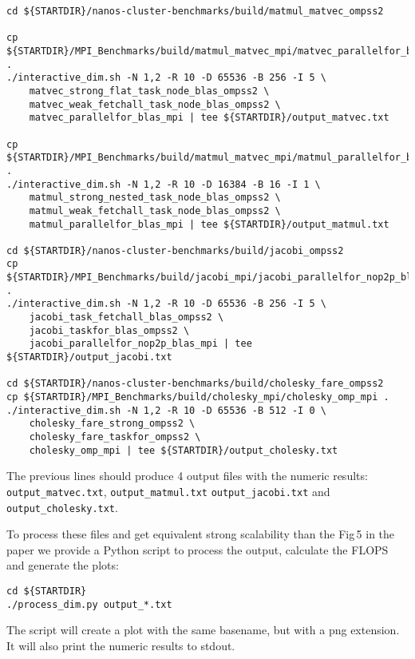 \documentclass{article}
\newcommand{\code}[1]{\texttt{#1}}
\begin{document}
\begin{lstlisting}
cd ${STARTDIR}/nanos-cluster-benchmarks/build/matmul_matvec_ompss2

cp ${STARTDIR}/MPI_Benchmarks/build/matmul_matvec_mpi/matvec_parallelfor_blas_mpi .
./interactive_dim.sh -N 1,2 -R 10 -D 65536 -B 256 -I 5 \
	matvec_strong_flat_task_node_blas_ompss2 \
	matvec_weak_fetchall_task_node_blas_ompss2 \
	matvec_parallelfor_blas_mpi | tee ${STARTDIR}/output_matvec.txt

cp ${STARTDIR}/MPI_Benchmarks/build/matmul_matvec_mpi/matmul_parallelfor_blas_mpi .
./interactive_dim.sh -N 1,2 -R 10 -D 16384 -B 16 -I 1 \
	matmul_strong_nested_task_node_blas_ompss2 \
	matmul_weak_fetchall_task_node_blas_ompss2 \
	matmul_parallelfor_blas_mpi | tee ${STARTDIR}/output_matmul.txt

cd ${STARTDIR}/nanos-cluster-benchmarks/build/jacobi_ompss2
cp ${STARTDIR}/MPI_Benchmarks/build/jacobi_mpi/jacobi_parallelfor_nop2p_blas_mpi .
./interactive_dim.sh -N 1,2 -R 10 -D 65536 -B 256 -I 5 \
	jacobi_task_fetchall_blas_ompss2 \
	jacobi_taskfor_blas_ompss2 \
	jacobi_parallelfor_nop2p_blas_mpi | tee ${STARTDIR}/output_jacobi.txt

cd ${STARTDIR}/nanos-cluster-benchmarks/build/cholesky_fare_ompss2
cp ${STARTDIR}/MPI_Benchmarks/build/cholesky_mpi/cholesky_omp_mpi .
./interactive_dim.sh -N 1,2 -R 10 -D 65536 -B 512 -I 0 \
	cholesky_fare_strong_ompss2 \
	cholesky_fare_taskfor_ompss2 \
	cholesky_omp_mpi | tee ${STARTDIR}/output_cholesky.txt
\end{lstlisting}

The previous lines should produce 4 output files with the numeric
results: \code{output\_matvec.txt}, \code{output\_matmul.txt}
\code{output\_jacobi.txt} and \code{output\_cholesky.txt}.

To process these files and get equivalent strong scalability than the
Fig\,5 in the paper we provide a Python script to process the output,
calculate the FLOPS and generate the plots:

\begin{lstlisting}
cd ${STARTDIR}
./process_dim.py output_*.txt
\end{lstlisting}

The script will create a plot with the same basename, but with a png
extension. It will also print the numeric results to stdout.
\end{document}

